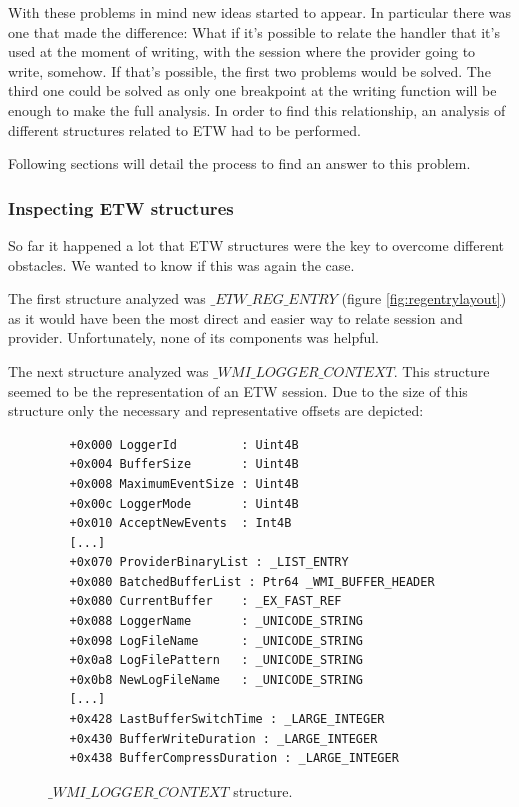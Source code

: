 With these problems in mind new ideas started to appear. In particular there was one that made the difference: What if it's possible to relate the handler that it's used at the moment of writing, with the session where the provider going to write, somehow. If that's possible, the first two problems would be solved. The third one could be solved as only one breakpoint at the writing function will be enough to make the full analysis. In order to find this relationship, an analysis of different structures related to ETW had to be performed.

Following sections will detail the process to find an answer to this problem.


\subsubsection{\bfseries Inspecting ETW structures}
So far it happened a lot that ETW structures were the key to overcome different obstacles. We wanted to know if this was again the case. 

The first structure analyzed was $\_ETW\_REG\_ENTRY$ (figure \ref{fig:regentrylayout}) as it would have been the most direct and easier way to relate session and provider. Unfortunately, none of its components was helpful.

The next structure analyzed was $\_WMI\_LOGGER\_CONTEXT$. This structure seemed to be the representation of an ETW session. Due to the size of this structure only the necessary and representative offsets are depicted: 

\begin{figure}[H]
  \begin{lstlisting}
   +0x000 LoggerId         : Uint4B
   +0x004 BufferSize       : Uint4B
   +0x008 MaximumEventSize : Uint4B
   +0x00c LoggerMode       : Uint4B
   +0x010 AcceptNewEvents  : Int4B
   [...]
   +0x070 ProviderBinaryList : _LIST_ENTRY
   +0x080 BatchedBufferList : Ptr64 _WMI_BUFFER_HEADER
   +0x080 CurrentBuffer    : _EX_FAST_REF
   +0x088 LoggerName       : _UNICODE_STRING
   +0x098 LogFileName      : _UNICODE_STRING
   +0x0a8 LogFilePattern   : _UNICODE_STRING
   +0x0b8 NewLogFileName   : _UNICODE_STRING
   [...]
   +0x428 LastBufferSwitchTime : _LARGE_INTEGER
   +0x430 BufferWriteDuration : _LARGE_INTEGER
   +0x438 BufferCompressDuration : _LARGE_INTEGER
  \end{lstlisting} 
  \caption[]{$\_WMI\_LOGGER\_CONTEXT$ structure.}
  \label{fig:wmi_logger_context}
\end{figure}

